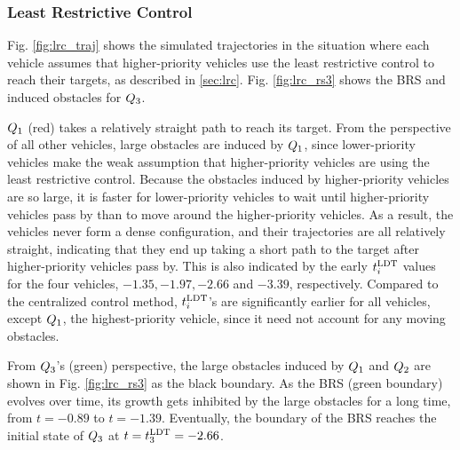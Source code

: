\subsubsection{Least Restrictive Control}
Fig. \ref{fig:lrc_traj} shows the simulated trajectories in the situation where each vehicle assumes that higher-priority vehicles use the least restrictive control to reach their targets, as described in \ref{sec:lrc}. Fig. \ref{fig:lrc_rs3} shows the BRS and induced obstacles for $Q_3$.

$Q_1$ (red) takes a relatively straight path to reach its target. From the perspective of all other vehicles, large obstacles are induced by $Q_1$, since lower-priority vehicles make the weak assumption that higher-priority vehicles are using the least restrictive control. Because the obstacles induced by higher-priority vehicles are so large, it is faster for lower-priority vehicles to wait until higher-priority vehicles pass by than to move around the higher-priority vehicles. As a result, the vehicles never form a dense configuration, and their trajectories are all relatively straight, indicating that they end up taking a short path to the target after higher-priority vehicles pass by. This is also indicated by the early $t^\text{LDT}_i$ values for the four vehicles, $-1.35, -1.97, -2.66$ and $-3.39$, respectively. Compared to the centralized control method, $t^\text{LDT}_i$'s are significantly earlier for all vehicles, except $Q_1$, the highest-priority vehicle, since it need not account for any moving obstacles. 

From $Q_3$'s (green) perspective, the large obstacles induced by $Q_1$ and $Q_2$ are shown in Fig. \ref{fig:lrc_rs3} as the black boundary. As the BRS (green boundary) evolves over time, its growth gets inhibited by the large obstacles for a long time, from $t=-0.89$ to $t=-1.39$. Eventually, the boundary of the BRS reaches the initial state of $Q_3$ at $t = t^\text{LDT}_3 = -2.66$.

